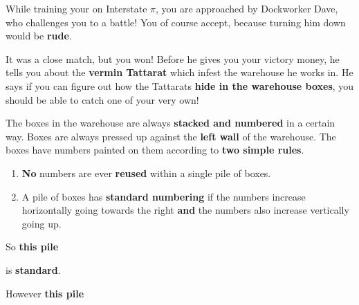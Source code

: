 

While training your \mappMobimon{} on Interstate \( \pi \), you are approached
by
Dockworker Dave, who challenges you to a \mappMobimon{} battle! You of course
accept, because turning him down would be \textbf{rude}.

It was a close match, but you won! Before he gives you your victory money, he
tells you about the \textbf{vermin \mappMobimon{} Tattarat} which infest the
warehouse he works in. He says if you can figure out how the Tattarats
\textbf{hide in the warehouse boxes}, you should be able to catch one of your
very own!

The boxes in the warehouse are always \textbf{stacked and numbered} in a certain
way. Boxes are always pressed up against the \textbf{left wall} of the
warehouse. The boxes have numbers painted on them according to \textbf{two
  simple rules}.
\begin{enumerate}
\item \textbf{No} numbers are ever \textbf{reused} within a single pile of boxes.
\item A pile of boxes has \textbf{standard numbering} if the numbers increase
  horizontally going towards the right \textbf{and} the numbers also increase
  vertically going up.
\end{enumerate}

So \textbf{this pile}
\begin{center}
\end{center}
is \textbf{standard}.

However \textbf{this pile}
\begin{center}
\end{center}

